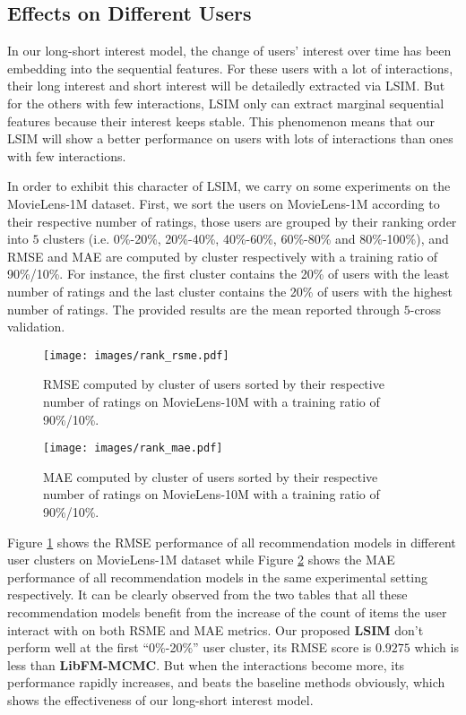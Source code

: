 \documentclass{sig-alternate-05-2015}
\begin{document}
\subsection{Effects on Different Users}
In our long-short interest model, the change of users' interest over time has been
embedding into the sequential features. For these users with a lot of interactions,
their long interest and short interest will be detailedly extracted via LSIM.
But for the others with few interactions, LSIM only can extract marginal
sequential features because their interest keeps stable.
This phenomenon means that our LSIM will show a better performance on users with
lots of interactions than ones with few interactions.

In order to exhibit this character of LSIM,
we carry on some experiments on the MovieLens-1M dataset.
First, we sort the users on MovieLens-1M according to their respective number
of ratings, those users are grouped by their ranking order into $5$  
clusters (i.e. 0\%-20\%, 20\%-40\%, 40\%-60\%, 60\%-80\% and 80\%-100\%),
and RMSE and MAE are computed by cluster respectively with a training ratio of 90\%/10\%.
For instance, the first cluster contains the 20\% of users with the least
number of ratings and the last cluster contains the 20\% of users with the
highest number of ratings.
The provided results are the mean reported through $5$-cross validation.

\begin{figure}[htbp]
    \centering
    \texttt{[image: images/rank\_rsme.pdf]}
    \caption{RMSE computed by cluster of users sorted by their respective number
    of ratings on MovieLens-10M with a training ratio of 90\%/10\%.}
    \label{fig:rank_rsme}
\end{figure}

\begin{figure}[htbp]
    \centering
    \texttt{[image: images/rank\_mae.pdf]}
    \caption{MAE computed by cluster of users sorted by their respective number
    of ratings on MovieLens-10M with a training ratio of 90\%/10\%.}
    \label{fig:rank_mae}
\end{figure}

Figure \ref{fig:rank_rsme} shows the RMSE performance of all recommendation models
in different user clusters on MovieLens-1M dataset while Figure \ref{fig:rank_mae}
shows the MAE performance of all recommendation models in the same experimental
setting respectively.
It can be clearly observed from the two tables that all these recommendation models
benefit from the increase of the count of items the user interact with on both
RSME and MAE metrics.
Our proposed \textbf{LSIM} don't perform well at the first ``0\%-20\%'' user cluster,
its RMSE score is $0.9275$ which is less than \textbf{LibFM-MCMC}.
But when the interactions become more, its performance rapidly increases,
and beats the baseline methods obviously, which shows the effectiveness of our
long-short interest model.
\end{document}
